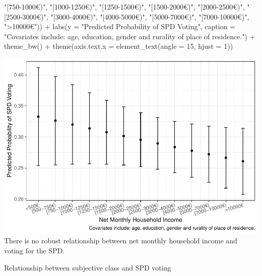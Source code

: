 \documentclass[
]{article}
\newenvironment{Shaded}{\begin{snugshade}}{\end{snugshade}}
\newcommand{\AttributeTok}[1]{\textcolor[rgb]{0.77,0.63,0.00}{#1}}
\newcommand{\DecValTok}[1]{\textcolor[rgb]{0.00,0.00,0.81}{#1}}
\newcommand{\FunctionTok}[1]{\textcolor[rgb]{0.00,0.00,0.00}{#1}}
\newcommand{\NormalTok}[1]{#1}
\newcommand{\SpecialCharTok}[1]{\textcolor[rgb]{0.00,0.00,0.00}{#1}}
\newcommand{\StringTok}[1]{\textcolor[rgb]{0.31,0.60,0.02}{#1}}
\begin{document}
\begin{Shaded}
\begin{Highlighting}[]
                                \StringTok{"[750{-}1000€)"}\NormalTok{, }\StringTok{"[1000{-}1250€)"}\NormalTok{, }
                                \StringTok{"[1250{-}1500€)"}\NormalTok{, }\StringTok{"[1500{-}2000€)"}\NormalTok{,}
                                \StringTok{"[2000{-}2500€)"}\NormalTok{, }\StringTok{"[2500{-}3000€)"}\NormalTok{,}
                                \StringTok{"[3000{-}4000€)"}\NormalTok{, }\StringTok{"[4000{-}5000€)"}\NormalTok{,}
                                \StringTok{"[5000{-}7000€)"}\NormalTok{, }\StringTok{"[7000{-}10000€)"}\NormalTok{,}
                                \StringTok{"\textgreater{}10000€"}\NormalTok{)) }\SpecialCharTok{+}
  \FunctionTok{labs}\NormalTok{(}\AttributeTok{y =} \StringTok{"Predicted Probability of SPD Voting"}\NormalTok{,}
       \AttributeTok{caption =} \StringTok{"Covariates include: age, education, gender and rurality of place of residence."}\NormalTok{) }\SpecialCharTok{+}
  \FunctionTok{theme\_bw}\NormalTok{() }\SpecialCharTok{+}
  \FunctionTok{theme}\NormalTok{(}\AttributeTok{axis.text.x =} \FunctionTok{element\_text}\NormalTok{(}\AttributeTok{angle =} \DecValTok{15}\NormalTok{, }\AttributeTok{hjust =} \DecValTok{1}\NormalTok{))}
\end{Highlighting}
\end{Shaded}

\includegraphics{AVCD_Final_Assignment-Edenhofer_files/figure-latex/spd-household-income-1.pdf}
There is no robust relationship between net monthly household income and
voting for the SPD.

Relationship between subjective class and SPD voting
\end{document}
